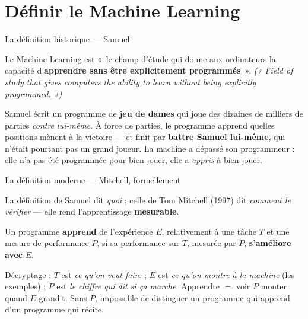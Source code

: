 \documentclass[aspectratio=169,11pt]{beamer}
\begin{document}
\section{Définir le Machine Learning}

\begin{frame}{La définition historique — Samuel}
\begin{ucaddef}
{\small Le Machine Learning est «~le champ d'étude qui donne aux ordinateurs la capacité d'\textbf{apprendre sans être explicitement programmés}~». \emph{(« Field of study that gives computers the ability to learn without being explicitly programmed. »)}}
\end{ucaddef}
\begin{ucadex}
{\small Samuel écrit un programme de \textbf{jeu de dames} qui joue des dizaines de milliers de parties \emph{contre lui-même}. À force de parties, le programme apprend quelles positions mènent à la victoire — et finit par \textbf{battre Samuel lui-même}, qui n'était pourtant pas un grand joueur. La machine a dépassé son programmeur : elle n'a pas été programmée pour bien jouer, elle a \emph{appris} à bien jouer.}
\end{ucadex}
\end{frame}

\begin{frame}{La définition moderne — Mitchell, formellement}
\begin{ucaddef}
{\small La définition de Samuel dit \emph{quoi} ; celle de Tom Mitchell (1997) dit \emph{comment le vérifier} — elle rend l'apprentissage \textbf{mesurable}.}
\end{ucaddef}
\begin{ucadform}
{\small Un programme \textbf{apprend} de l'expérience $E$, relativement à une tâche $T$ et une mesure de performance $P$, si sa performance sur $T$, mesurée par $P$, \textbf{s'améliore avec} $E$.}
\end{ucadform}
{\small Décryptage : $T$ est \emph{ce qu'on veut faire} ; $E$ est \emph{ce qu'on montre à la machine} (les exemples) ; $P$ est \emph{le chiffre qui dit si ça marche}. Apprendre $=$ voir $P$ monter quand $E$ grandit. Sans $P$, impossible de distinguer un programme qui apprend d'un programme qui récite.}
\end{frame}
\end{document}

